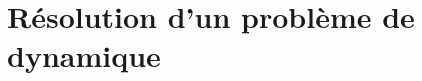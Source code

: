 %
%

\setchapterpreamble[u]{\margintoc}

\chapter{Résolution d'un problème de dynamique}

\setcounter{cptApplication}{1}
\setcounter{cptTD}{1}
\setcounter{cptColle}{1}




%
% 
%



\renewcommand{\repExo}{\repRel/PSI_Cy_04_ModelisationDynamique/Chapitre_03_Methodologie/PFD_1D/}
\renewcommand{\nomExo}{Cy_04_Ch_03_Application_01_Pompe}
\graphicspath{{\repStyle/png}{\repExo\nomExo/images}}

\proffalse
 
\iflivret \else \proftrue

\fi

\renewcommand{\repExo}{\repRel/PSI_Cy_04_ModelisationDynamique/Chapitre_03_Methodologie/PFD_CO/}
%
% 
%

\renewcommand{\nomExo}{Cy_04_03_PFD_CO_App_02_BancVib}
\graphicspath{{\repStyle/png}{\repExo\nomExo/images}}

\proffalse
 
\iflivret \else \proftrue

\fi

\renewcommand{\nomExo}{Cy_04_03_PFD_CO_App_03_Centrifugeuse}
\graphicspath{{\repStyle/png}{\repExo\nomExo/images}}

